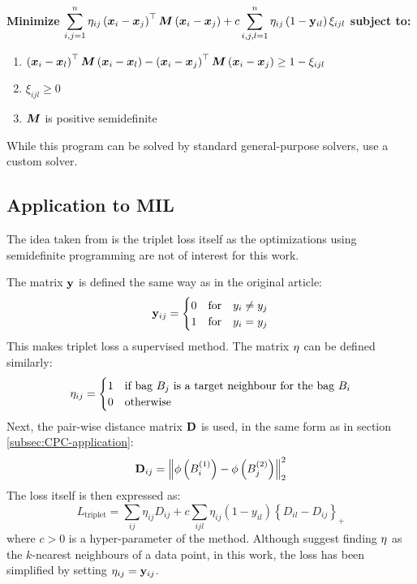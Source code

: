 \noindent \textbf{Minimize} \( \displaystyle \sum_{i, j = 1}^n \mathbf{\eta}_{ij} \left( \bm{x}_i - \bm{x}_j \right)^\top \bm{M} \left( \bm{x}_i - \bm{x}_j \right) + c \sum_{i, j, l = 1}^n \mathbf{\eta}_{ij} \left( 1 - \mathbf{y}_{il} \right) \xi_{ijl} \) \textbf{subject to:}
\begin{enumerate}[\textbf{(\theenumi)}]
  \item \( \displaystyle \left( \bm{x}_i - \bm{x}_l \right)^\top \bm{M} \left( \bm{x}_i - \bm{x}_l \right) - \left( \bm{x}_i - \bm{x}_j \right)^\top \bm{M} \left( \bm{x}_i - \bm{x}_j \right) \geq 1 - \xi_{ijl} \)
  \item \( \displaystyle \xi_{ijl} \geq 0 \)
  \item \( \displaystyle \bm{M} \) is positive semidefinite
\end{enumerate}

While this program can be solved by standard general-purpose solvers, \cite{weinberger_distance_2006} use a custom solver.

\subsection{Application to MIL}
The idea taken from \cite{weinberger_distance_2006} is the triplet loss itself as the optimizations using semidefinite programming are not of interest for this work.

The matrix \( \mathbf{y} \) is defined the same way as in the original article:
\[ \mathbf{y}_{ij} = \begin{cases}
    0 &\text{for} \quad y_i \neq y_j \\
    1 &\text{for} \quad y_i = y_j \\
  \end{cases} \]
This makes triplet loss a supervised method. The matrix \( \mathbf{\eta} \) can be defined similarly:
\[ \mathbf{\eta}_{ij} = \begin{cases}
    1 &\text{if bag } B_j \text{ is a target neighbour for the bag } B_i \\
    0 &\text{otherwise}
  \end{cases} \]
Next, the pair-wise distance matrix \( \mathbf{D} \) is used, in the same form as in section \ref{subsec:CPC-application}:
\[ \mathbf{D}_{ij} = \left\lVert \phi \left( B_i^{(1)} \right) - \phi \left( B_j^{(2)} \right) \right\rVert_2^2 \]
The loss itself is then expressed as:
\[ L_\mathrm{triplet} = \sum_{ij} \eta_{ij} D_{ij} + c \sum_{ijl} \eta_{ij} \left( 1 - y_{il} \right) \left\{ D_{il} - D_{ij} \right\}_+ \]
where \( c > 0 \) is a hyper-parameter of the method. Although \cite{weinberger_distance_2006} suggest finding \( \mathbf{\eta} \) as the \( k \)-nearest neighbours of a data point, in this work, the loss has been simplified by setting \( \mathbf{\eta}_{ij} = \mathbf{y}_{ij} \).

